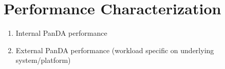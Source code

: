 \section{Performance Characterization}
\label{sec:panda_performance}



\begin{enumerate}
  \item Internal PanDA performance
  \item External PanDA performance (workload specific on underlying system/platform)
\end{enumerate}



